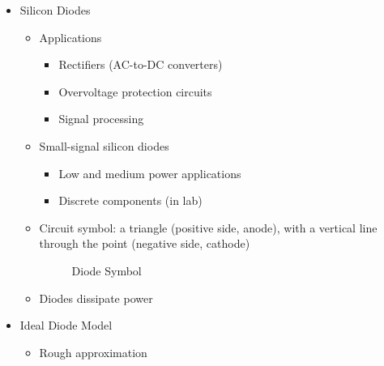 \begin{itemize}

  \item Silicon Diodes

    \begin{itemize}

      \item Applications

        \begin{itemize}

          \item Rectifiers (AC-to-DC converters)

          \item Overvoltage protection circuits

          \item Signal processing

        \end{itemize}

      \item Small-signal silicon diodes

        \begin{itemize}

          \item Low and medium power applications

          \item Discrete components (in lab)

        \end{itemize}

      \item Circuit symbol: a triangle (positive side, anode), with a vertical line through the point (negative side, cathode)

        \begin{figure}[H]
          \centering
          
          \caption{Diode Symbol}
          \label{fig:1}
        \end{figure}

      \item Diodes dissipate power

    \end{itemize}

  \item Ideal Diode Model

    \begin{itemize}

      \item Rough approximation


\end{itemize}
\end{itemize}
